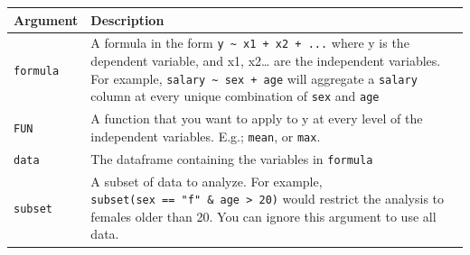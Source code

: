 \documentclass[]{book}
\theoremstyle{definition}
\theoremstyle{definition}
\theoremstyle{remark}
\begin{document}
\begin{longtable}[]{@{}ll@{}}
\toprule
\begin{minipage}[b]{0.18\columnwidth}\raggedright\strut
Argument\strut
\end{minipage} & \begin{minipage}[b]{0.67\columnwidth}\raggedright\strut
Description\strut
\end{minipage}\tabularnewline
\midrule
\endhead
\begin{minipage}[t]{0.18\columnwidth}\raggedright\strut
\texttt{formula}\strut
\end{minipage} & \begin{minipage}[t]{0.67\columnwidth}\raggedright\strut
A formula in the form \texttt{y\ \textasciitilde{}\ x1\ +\ x2\ +\ ...}
where y is the dependent variable, and x1, x2\ldots{} are the
independent variables. For example,
\texttt{salary\ \textasciitilde{}\ sex\ +\ age} will aggregate a
\texttt{salary} column at every unique combination of \texttt{sex} and
\texttt{age}\strut
\end{minipage}\tabularnewline
\begin{minipage}[t]{0.18\columnwidth}\raggedright\strut
\texttt{FUN}\strut
\end{minipage} & \begin{minipage}[t]{0.67\columnwidth}\raggedright\strut
A function that you want to apply to y at every level of the independent
variables. E.g.; \texttt{mean}, or \texttt{max}.\strut
\end{minipage}\tabularnewline
\begin{minipage}[t]{0.18\columnwidth}\raggedright\strut
\texttt{data}\strut
\end{minipage} & \begin{minipage}[t]{0.67\columnwidth}\raggedright\strut
The dataframe containing the variables in \texttt{formula}\strut
\end{minipage}\tabularnewline
\begin{minipage}[t]{0.18\columnwidth}\raggedright\strut
\texttt{subset}\strut
\end{minipage} & \begin{minipage}[t]{0.67\columnwidth}\raggedright\strut
A subset of data to analyze. For example,
\texttt{subset(sex\ ==\ "f"\ \&\ age\ \textgreater{}\ 20)} would
restrict the analysis to females older than 20. You can ignore this
argument to use all data.\strut
\end{minipage}\tabularnewline
\bottomrule
\end{longtable}
\end{document}
